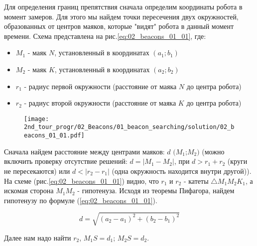 \solutionSection

Для определения границ препятствия сначала определим координаты робота в момент замеров. Для этого мы найдем точки пересечения двух окружностей, образованных от центров маяков, которые "видят" робота в данный момент времени. Схема представлена на рис.\ref{eq:02_beacons_01_01}, где: \\

\begin{itemize}
	\item $M_1$ - маяк $N$, установленный в координатах $(a_1; b_1)$
	\item $M_2$ - маяк $K$, установленный в координатах $(a_2; b_2)$
	\item $r_1$ - радиус первой окружности (расстояние от маяка $N$ до центра робота)
	\item $r_2$ - радиус второй окружности (расстояние от маяка $K$ до центра робота)
\end{itemize}

\begin{figure}[h!]
	\centering
	\texttt{[image: 2nd\_tour\_progr/02\_Beacons/01\_beacon\_searching/solution/02\_beacons\_01\_01.pdf]}
	\caption{}
	\label{fig:02_beacons_01_01}
\end{figure}

Сначала найдем расстояние между центрами маяков: $d$ $(M_1$;$M_2)$ (можно включить проверку отсутствие решений: $d = |M_1 - M_2|$, при $d > r_1 + r_2$ (круги не пересекаются) или $d < |r_2 - r_1|$ (одна окружность находится внутри другой)).
На схеме (рис.\ref{eq:02_beacons_01_01}) видно, что $r_1$ и $r_2$ - катеты $\triangle M_1M_2K_1$, а искомая сторона $M_1M_2$ - гипотенуза. Исходя из теоремы Пифагора, найдем гипотенузу по формуле (\ref{eq:02_beacons_01_01}).

\begin{equation}
	d = \sqrt{{(a_2 - a_1)}^2 + {(b_2 - b_1)}^2}
	\label{eq:02_beacons_01_01}
\end{equation}

Далее нам надо найти $r_2$, $M_1S = d_1$; $M_2S = d_2$.

